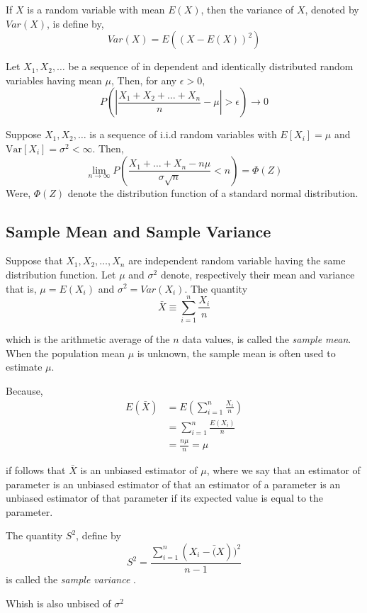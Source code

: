 \begin{definition}[Variance]
	If $ X $ is a random variable with mean $ E(X) $, then the variance of $ X $,
	denoted by $ Var(X) $, is define by,
	\[
		Var(X)=E\left( (X-E(X))^{2} \right)
	\]
\end{definition}

\begin{theorem}
	Let $X_1,X_2,\ldots$ be a sequence of in dependent and identically distributed 
	random variables having mean $ \mu $, Then, for any $ \epsilon >0 $,
	\[
		P \left( \left|\frac{X_1+X_2+ \ldots + X_n }{n} - \mu \right| > \epsilon \right) \to 0 
	\]
\end{theorem}

\begin{theorem}
	Suppose $X_1, X_2, \ldots  $ is a sequence of i.i.d random variables with 
    $E[X_i]=\mu$ and $\text{Var}[X_i]=\sigma ^{2} < \infty$. Then, 
	\[
		\lim_{n \to \infty} P\left( \frac{X_1+\ldots+X_n - n\mu}{\sigma \sqrt{n } } < n \right) = \Phi(Z)
	\]
	Were, $\Phi(Z)$ denote the distribution function of a standard normal distribution.
\end{theorem}

\subsection*{Sample Mean and Sample Variance}
Suppose that $ X_1,X_2,\ldots,X_n $ are independent random variable having the same
distribution function. Let $ \mu $ and $ \sigma ^{2} $ denote, respectively 
their mean and variance that is, $ \mu = E(X_i) $ and $ \sigma ^{2} = Var(X_i) $.
The quantity
\[
	\bar{X} \equiv \sum_{i=1}^{n} \frac{X_i}{n}
\]

which is the arithmetic average of the $ n $ data values, is called the \textit{sample mean}.
When the population mean $ \mu $ is unknown, the sample mean is often used to estimate $ \mu .$

Because, 
\begin{align*}
	E(\bar{X}) & = E\left( \sum_{i=1}^{n} \frac{X_i}{n} \right) \\ 
	           & = \sum_{i=1}^{n} \frac{E(X_i)}{n}              \\ 
	           & = \frac{n \mu}{n} = \mu
\end{align*}

if follows that $ \bar{X} $ is an unbiased estimator of $ \mu $, where we say that an estimator
of parameter is an unbiased estimator of that an estimator of a parameter is an unbiased estimator
of that parameter if its expected value is equal to the parameter.

The quantity $ S ^{2} $, define by 
\[
	S ^{2} = \frac{\sum_{i=1}^{n}(X_i - \bar(X))^{2} }{n-1}
\]
is called the \textit{sample variance} .

Whish is also unbised of $ \sigma ^{2} $
